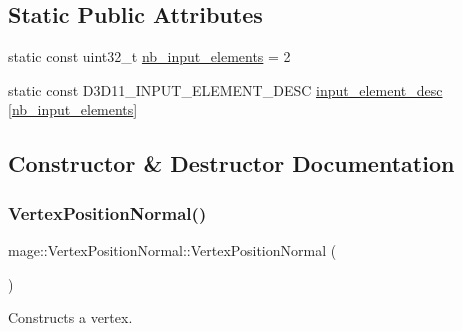 \subsection*{Static Public Attributes}
\begin{DoxyCompactItemize}
\item 
static const uint32\+\_\+t \hyperlink{structmage_1_1_vertex_position_normal_a7ccf8843b44100cfdd8ad9bc30228f94}{nb\+\_\+input\+\_\+elements} = 2
\item 
static const D3\+D11\+\_\+\+I\+N\+P\+U\+T\+\_\+\+E\+L\+E\+M\+E\+N\+T\+\_\+\+D\+E\+SC \hyperlink{structmage_1_1_vertex_position_normal_ab4765069df93930c4fecc0029503061e}{input\+\_\+element\+\_\+desc} \mbox{[}\hyperlink{structmage_1_1_vertex_position_normal_a7ccf8843b44100cfdd8ad9bc30228f94}{nb\+\_\+input\+\_\+elements}\mbox{]}
\end{DoxyCompactItemize}


\subsection{Constructor \& Destructor Documentation}
\hypertarget{structmage_1_1_vertex_position_normal_a470e35daf194befbf45ac3ecfd6848e3}{}\label{structmage_1_1_vertex_position_normal_a470e35daf194befbf45ac3ecfd6848e3} 
\subsubsection{\texorpdfstring{Vertex\+Position\+Normal()}{VertexPositionNormal()}\hspace{0.1cm}{\footnotesize\ttfamily [1/3]}}
{\footnotesize\ttfamily mage\+::\+Vertex\+Position\+Normal\+::\+Vertex\+Position\+Normal (\begin{DoxyParamCaption}{ }\end{DoxyParamCaption})\hspace{0.3cm}{\ttfamily [default]}}

Constructs a vertex. \hypertarget{structmage_1_1_vertex_position_normal_ad2fc50a2050b9a7c961e1bd98d736710}{}\label{structmage_1_1_vertex_position_normal_ad2fc50a2050b9a7c961e1bd98d736710} 
